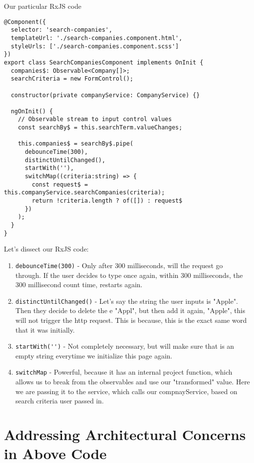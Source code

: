 Our particular RxJS code 
\begin{lstlisting}[caption=search-companies.component.ts]
@Component({
  selector: 'search-companies',
  templateUrl: './search-companies.component.html',
  styleUrls: ['./search-companies.component.scss']
})
export class SearchCompaniesComponent implements OnInit {
  companies$: Observable<Company[]>;
  searchCriteria = new FormControl();

  constructor(private companyService: CompanyService) {}

  ngOnInit() {
    // Observable stream to input control values
    const searchBy$ = this.searchTerm.valueChanges;
    
    this.companies$ = searchBy$.pipe(
      debounceTime(300),
      distinctUntilChanged(),
      startWith(''),      
      switchMap((criteria:string) => {
        const request$ = this.companyService.searchCompanies(criteria);
        return !criteria.length ? of([]) : request$          
      })
    );
  }
}  
\end{lstlisting}

Let's dissect our RxJS code: 
\begin{enumerate}
  \item \lstinline{debounceTime(300)} - Only after 300 milliseconds, will the request go through. If the user decides to type once again, within 300 milliseconds, the 300 millisecond count time, restarts again. 
  \item \lstinline{distinctUntilChanged()} - Let's say the string the user inputs is "Apple". Then they decide to delete the e "Appl", but then add it again, "Apple", this will not trigger the http request. This is because, this is the exact same word that it was initially. 
  \item \lstinline{startWith('')} - Not completely necessary, but will make sure that is an empty string everytime we initialize this page again. 
  \item \lstinline{switchMap} - Powerful, because it has an internal project function, which allows us to break from the observables and use our "transformed" value. Here we are passing it to the service, which calls our compnayService, based on search criteria user passed in. 
\end{enumerate}

\section{Addressing Architectural Concerns in Above Code}
